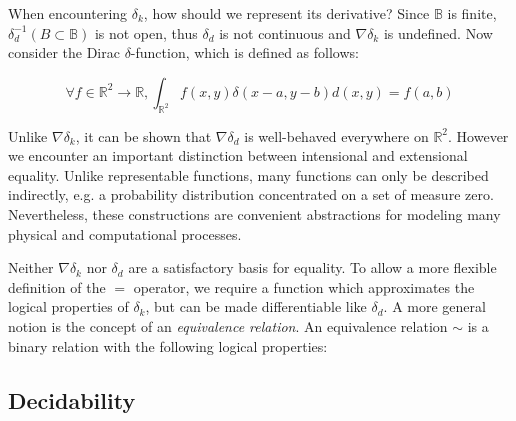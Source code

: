 \documentclass[11pt]{article}
\begin{document}
    When encountering $\delta_k$, how should we represent its derivative? Since $\mathbb{B}$ is finite, $\delta_d^{-1}(B\subset \mathbb{B})$ is not open, thus $\delta_d$ is not continuous and $\nabla\delta_k$ is undefined. Now consider the Dirac $\delta$-function, which is defined as follows: %

    $$
    \forall f \in \mathbb{R}^2 \rightarrow \mathbb{R}, \int_{\mathbb{R}^2} f(x,y)\delta(x-a,y-b)d(x, y) = f(a,b)
    $$

    Unlike $\nabla\delta_k$, it can be shown that $\nabla\delta_d$ is well-behaved everywhere on $\mathbb{R}^2$. However we encounter an important distinction between intensional and extensional equality. Unlike representable functions, many functions can only be described indirectly, e.g. a probability distribution concentrated on a set of measure zero. Nevertheless, these constructions are convenient abstractions for modeling many physical and computational processes.

    Neither $\nabla\delta_k$ nor $\delta_d$ are a satisfactory basis for equality. To allow a more flexible definition of the $=$ operator, we require a function which approximates the logical properties of $\delta_k$, but can be made differentiable like $\delta_d$. A more general notion is the concept of an \textit{equivalence relation}. An equivalence relation $\sim$ is a binary relation with the following logical properties:


    \pagebreak\subsection{Decidability}\label{sec:algorithms}
\end{document}
